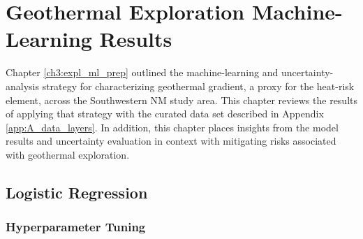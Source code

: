 \chapter{Geothermal Exploration Machine-Learning Results}\label{ch5:ml_results}

Chapter \ref{ch3:expl_ml_prep} outlined the machine-learning and uncertainty-analysis strategy for characterizing geothermal gradient, a proxy for the heat-risk element, across the Southwestern NM study area. This chapter reviews the results of applying that strategy with the curated data set described in Appendix \ref{app:A_data_layers}. In addition, this chapter places insights from the model results and uncertainty evaluation in context with mitigating risks associated with geothermal exploration.

\section{Logistic Regression} \label{ch5:lr_model}

\subsection{Hyperparameter Tuning} \label{ch5:lr_tuning}

